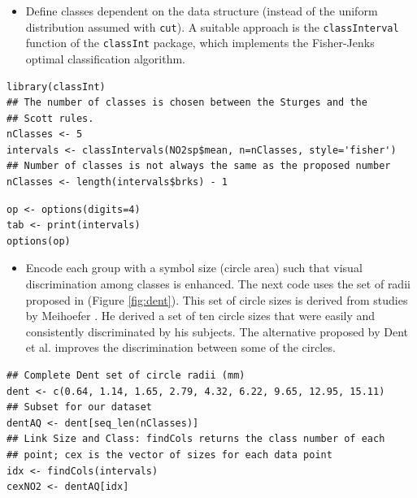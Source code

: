 \begin{itemize}
\item Define classes dependent on the data structure (instead of the
uniform distribution assumed with \texttt{cut}). A suitable approach is
the \texttt{classInterval} function of the \texttt{classInt} package, which
implements the Fisher-Jenks optimal classification
algorithm.
\end{itemize}


\lstset{language=R,numbers=none}
\begin{lstlisting}
library(classInt)
## The number of classes is chosen between the Sturges and the
## Scott rules.
nClasses <- 5
intervals <- classIntervals(NO2sp$mean, n=nClasses, style='fisher')
## Number of classes is not always the same as the proposed number
nClasses <- length(intervals$brks) - 1
\end{lstlisting}

\lstset{language=R,numbers=none}
\begin{lstlisting}
op <- options(digits=4)
tab <- print(intervals)
options(op)
\end{lstlisting}

\begin{itemize}
\item Encode each group with a symbol size (circle area) such that visual
discrimination among classes is enhanced. The next code uses the set
of radii proposed in \cite{Dent.Torguson.ea2008} (Figure
\ref{fig:dent}). This set of circle sizes is derived from studies by Meihoefer \cite{Meihoefer1969}. He derived a set of ten
circle sizes that were easily and consistently discriminated by his
subjects. The alternative proposed by Dent et al. improves the
discrimination between some of the circles.
\end{itemize}

\lstset{language=R,numbers=none}
\begin{lstlisting}
## Complete Dent set of circle radii (mm)
dent <- c(0.64, 1.14, 1.65, 2.79, 4.32, 6.22, 9.65, 12.95, 15.11)
## Subset for our dataset
dentAQ <- dent[seq_len(nClasses)]
## Link Size and Class: findCols returns the class number of each
## point; cex is the vector of sizes for each data point
idx <- findCols(intervals)
cexNO2 <- dentAQ[idx]
\end{lstlisting}

